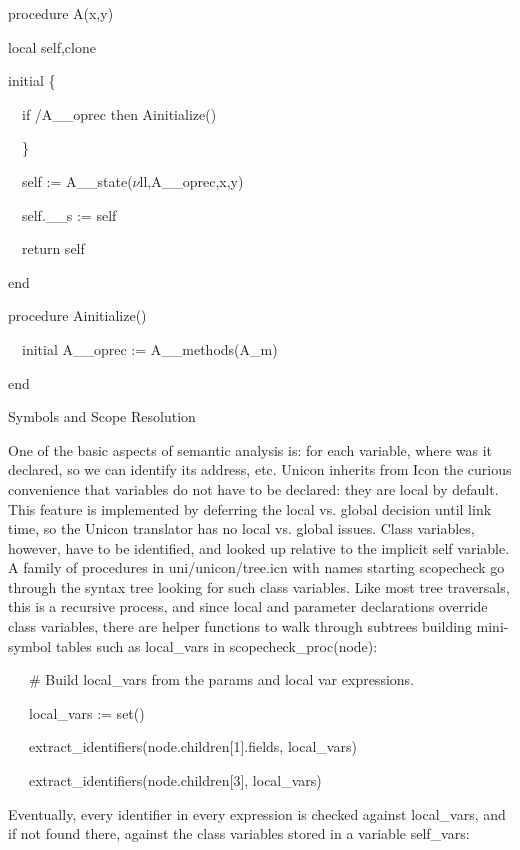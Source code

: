 {\ttfamily\mdseries
procedure A(x,y)}

{\ttfamily\mdseries
local self,clone}

{\ttfamily\mdseries
initial \{}

{\ttfamily\mdseries
\ \ if /A\_\_oprec then Ainitialize()}

{\ttfamily\mdseries
\ \ \}}

{\ttfamily\mdseries
\ \ self := A\_\_state($\nu $ll,A\_\_oprec,x,y)}

{\ttfamily\mdseries
\ \ self.\_\_s := self}

{\ttfamily\mdseries
\ \ return self}

{\ttfamily\mdseries
end}


\bigskip

{\ttfamily\mdseries
procedure Ainitialize()}

{\ttfamily\mdseries
\ \ initial A\_\_oprec := A\_\_methods(A\_m)}

{\ttfamily\mdseries
end}

{\sffamily
Symbols and Scope Resolution }


One of the basic aspects of semantic analysis is: for each variable,
where was it declared, so we can identify its address, etc. Unicon
inherits from Icon the curious convenience that variables do not have
to be declared: they are local by default. This feature is implemented
by deferring the local vs. global decision until link time, so the
Unicon translator has no local vs. global issues. Class variables,
however, have to be identified, and looked up relative to the implicit
{\textquotedbl}self{\textquotedbl} variable. A family of procedures in
uni/unicon/tree.icn with names starting
{\textquotedbl}scopecheck{\textquotedbl} go through the syntax tree
looking for such class variables. Like most tree traversals, this is a
recursive process, and since local and parameter declarations override
class variables, there are helper functions to walk through subtrees
building mini-symbol tables such as local\_vars in
scopecheck\_proc(node):

{\ttfamily\mdseries
\ \ \ \# Build local\_vars from the params and local var expressions.}

{\ttfamily\mdseries
\ \ \ local\_vars := set()}

{\ttfamily\mdseries
\ \ \ extract\_identifiers(node.children[1].fields, local\_vars)}

{\ttfamily\mdseries
\ \ \ extract\_identifiers(node.children[3], local\_vars)}

Eventually, every identifier in every expression is checked against
local\_vars, and if not found there, against the class variables
stored in a variable self\_vars:

